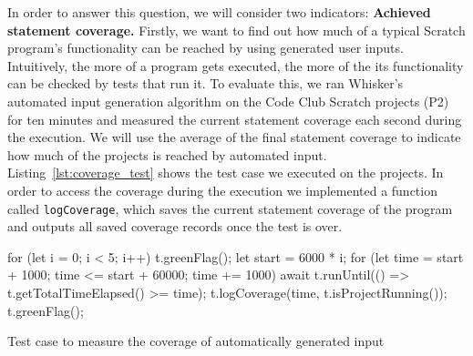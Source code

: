 \noindent In order to answer this question, we will consider two indicators:
\textbf{Achieved statement coverage.}
Firstly, we want to find out how much of a typical Scratch program's functionality can be reached by using generated user inputs.
Intuitively, the more of a program gets executed, the more of the its functionality can be checked by tests that run it.
To evaluate this, we ran Whisker's automated input generation algorithm on the Code Club Scratch projects (P2) for ten minutes
and measured the current statement coverage each second during the execution.
We will use the average of the final statement coverage to indicate how much of the projects is reached by automated input.
Listing~\ref{lst:coverage_test} shows the test case we executed on the projects.
In order to access the coverage during the execution we implemented a function called \texttt{logCoverage},
which saves the current statement coverage of the program and outputs all saved coverage records once the test is over.
\parspace


\begin{listing}
    \centering

    \begin{minipage}{.9\textwidth}
        \begin{javascriptcode}
            for (let i = 0; i < 5; i++) {
                t.greenFlag();
                let start = 6000 * i;
                for (let time = start + 1000; time <= start + 60000; time += 1000) {
                    await t.runUntil(() => t.getTotalTimeElapsed() >= time);
                    t.logCoverage(time, t.isProjectRunning());
                }
                t.greenFlag();
            }
        \end{javascriptcode}
    \end{minipage}

    \caption{Test case to measure the coverage of automatically generated input}
    \label{lst:coverage_test}
\end{listing}

